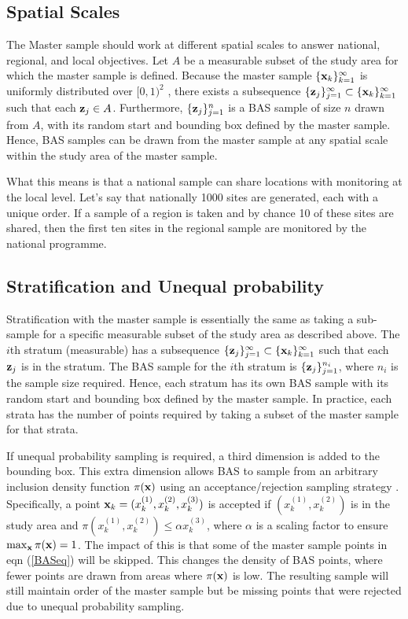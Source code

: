 \documentclass[titlepage]{article}
\begin{document}
\subsection{Spatial Scales}
The Master sample should work at different spatial scales to answer national, regional, and local objectives. Let $A$ be a measurable subset of the study area for which the master sample is defined. Because the master sample $\{{\bf x}_k\}_{k=1}^{\infty}$ is uniformly distributed over $[0,1)^2$ \citep{Wang2000}, there exists a subsequence $\{{\bf z}_j\}_{j=1}^{\infty} \subset \{{\bf x}_k\}_{k=1}^{\infty}$ such that each ${\bf z}_j \in A$. Furthermore, $\{{\bf z}_j\}_{j=1}^n$ is a BAS sample of size $n$ drawn from $A$, with its random start and bounding box defined by the master sample. Hence, BAS samples can be drawn from the master sample at any spatial scale within the study area of the master sample.

What this means is that a national sample can share locations with monitoring at the local level. Let's say that nationally 1000 sites are generated, each with a unique order. If a sample of a region is taken and by chance 10 of these sites are shared, then the first ten sites in the regional sample are monitored by the national programme.

\subsection{Stratification and Unequal probability}
Stratification with the master sample is essentially the same as taking a sub-sample for a specific measurable subset of the study area as described above. The $i$th stratum (measurable) has a subsequence $\{{\bf z}_j\}_{j=1}^{\infty} \subset \{{\bf x}_k\}_{k=1}^{\infty}$ such that each ${\bf z}_j$ is in the stratum. The BAS sample for the $i$th stratum is $\{{\bf z}_j\}_{j=1}^{n_i}$, where $n_i$ is the sample size required. Hence, each stratum has its own BAS sample with its random start and bounding box defined by the master sample. In practice, each strata has the number of points required by taking a subset of the master sample for that strata.

If unequal probability sampling is required, a third dimension is added to the bounding box. This extra dimension allows BAS to sample from an arbitrary inclusion density function $\pi(\bf{x})$ using an acceptance/rejection sampling strategy \citep{Robertson2013}. Specifically, a point ${\bf x}_k = (x_k^{(1)}, x_k^{(2)}, x_k^{(3)})$ is accepted if $(x_k^{(1)}, x_k^{(2)})$ is in the study area and $\pi(x_k^{(1)}, x_k^{(2)}) \leq \alpha x_k^{(3)}$, where $\alpha$ is a scaling factor to ensure $\max_{{\bf x}}\pi({\bf x}) = 1$. The impact of this is that some of the master sample points in eqn (\ref{BASeq}) will be skipped. This changes the density of BAS points, where fewer points are drawn from areas where $\pi({\bf x})$ is low. The resulting sample will still maintain order of the master sample but be missing points that were rejected due to unequal probability sampling.
\end{document}
